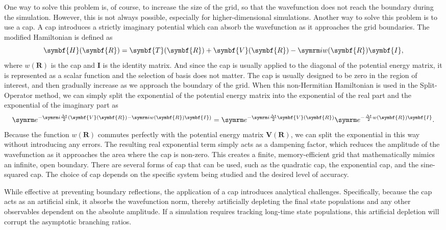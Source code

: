 One way to solve this problem is, of course, to increase the size of the grid, so that the wavefunction does not reach the boundary during the simulation. However, this is not always possible, especially for higher-dimensional simulations. Another way to solve this problem is to use a \gls{cap}. A \gls{cap} introduces a strictly imaginary potential which can absorb the wavefunction as it approaches the grid boundaries. The modified Hamiltonian is defined as
\begin{equation}
\symbf{H}(\symbf{R})=\symbf{T}(\symbf{R})+\symbf{V}(\symbf{R})-\i w(\symbf{R})\symbf{I},
\end{equation}
where $w(\symbf{R})$ is the \gls{cap} and $\symbf{I}$ is the identity matrix. And since the \gls{cap} is usually applied to the diagonal of the potential energy matrix, it is represented as a scalar function and the selection of basis does not matter. The \gls{cap} is usually designed to be zero in the region of interest, and then gradually increase as we approach the boundary of the grid. When this non-Hermitian Hamiltonian is used in the Split-Operator method, we can simply split the exponential of the potential energy matrix into the exponential of the real part and the exponential of the imaginary part as
\begin{equation}
\e^{-\i\frac{\Delta t}{2}(\symbf{V}(\symbf{R})-\i w(\symbf{R})\symbf{I})}=\e^{-\i\frac{\Delta t}{2}\symbf{V}(\symbf{R})}\e^{-\frac{\Delta t}{2}w(\symbf{R})\symbf{I}}.
\end{equation}
Because the function $w(\symbf{R})$ commutes perfectly with the potential energy matrix $\symbf{V}(\symbf{R})$, we can split the exponential in this way without introducing any errors. The resulting real exponential term simply acts as a dampening factor, which reduces the amplitude of the wavefunction as it approaches the area where the \gls{cap} is non-zero. This creates a finite, memory-efficient grid that mathematically mimics an infinite, open boundary. There are several forms of \gls{cap} that can be used, such as the quadratic \gls{cap}, the exponential \gls{cap}, and the sine-squared \gls{cap}. The choice of \gls{cap} depends on the specific system being studied and the desired level of accuracy.

While effective at preventing boundary reflections, the application of a \gls{cap} introduces analytical challenges. Specifically, because the \gls{cap} acts as an artificial sink, it absorbs the wavefunction norm, thereby artificially depleting the final state populations and any other observables dependent on the absolute amplitude. If a simulation requires tracking long-time state populations, this artificial depletion will corrupt the asymptotic branching ratios.


